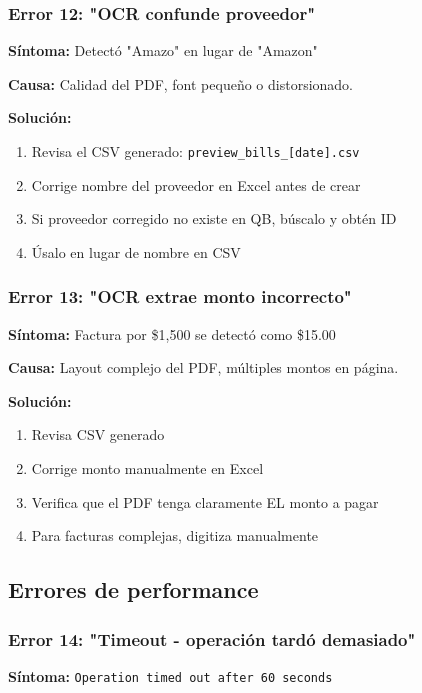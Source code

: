 \documentclass[12pt,oneside]{article}
\begin{document}
\subsubsection{Error 12: "OCR confunde proveedor"}

\textbf{Síntoma:} Detectó "Amazo" en lugar de "Amazon"

\textbf{Causa:} Calidad del PDF, font pequeño o distorsionado.

\textbf{Solución:}
\begin{enumerate}
    \item Revisa el CSV generado: \texttt{preview\_bills\_[date].csv}
    \item Corrige nombre del proveedor en Excel antes de crear
    \item Si proveedor corregido no existe en QB, búscalo y obtén ID
    \item Úsalo en lugar de nombre en CSV
\end{enumerate}

\subsubsection{Error 13: "OCR extrae monto incorrecto"}

\textbf{Síntoma:} Factura por \$1,500 se detectó como \$15.00

\textbf{Causa:} Layout complejo del PDF, múltiples montos en página.

\textbf{Solución:}
\begin{enumerate}
    \item Revisa CSV generado
    \item Corrige monto manualmente en Excel
    \item Verifica que el PDF tenga claramente EL monto a pagar
    \item Para facturas complejas, digitiza manualmente
\end{enumerate}

\subsection{Errores de performance}

\subsubsection{Error 14: "Timeout - operación tardó demasiado"}

\textbf{Síntoma:} \texttt{Operation timed out after 60 seconds}
\end{document}
